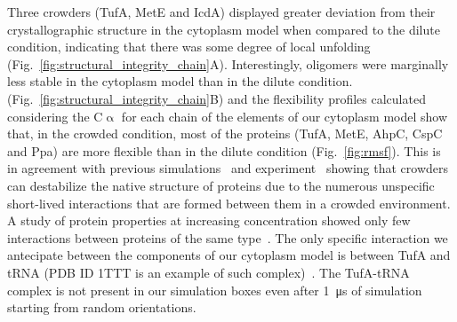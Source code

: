 \documentclass[journal=jpcisd8,manuscript=article]{achemso}
\begin{document}
Three crowders (TufA, MetE and IcdA) displayed greater deviation from
their crystallographic structure in the cytoplasm model when compared
to the dilute condition, indicating that there was some degree of
local unfolding
(Fig.~\ref{fig:structural_integrity_chain}A). Interestingly, oligomers
were marginally less stable in the cytoplasm model than in the dilute
condition.  (Fig.~\ref{fig:structural_integrity_chain}B) and the
flexibility profiles calculated considering the C$\upalpha$ for each
chain of the elements of our cytoplasm model show that, in the crowded
condition, most of the proteins (TufA, MetE, AhpC, CspC and Ppa) are
more flexible than in the dilute condition (Fig.~\ref{fig:rmsf}). This
is in agreement with previous simulations~\cite{Feig2011} and
experiment~\cite{miklos2011,Wang2012b} showing that crowders can
destabilize the native structure of proteins due to the numerous
unspecific short-lived interactions that are formed between them in a
crowded environment. A study of protein properties at increasing
concentration showed only few interactions between proteins of the
same type~\cite{Bashardanesh2019a}. The only specific interaction we
antecipate between the components of our cytoplasm model is between
TufA and tRNA (PDB ID 1TTT is an example of such
complex)~\cite{nissen1995crystal}. The TufA-tRNA complex is not
present in our simulation boxes even after \SI{1}{\micro\second} of
simulation starting from random orientations.

\end{document}
